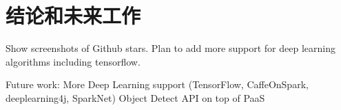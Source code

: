 \chapter{结论和未来工作}

Show screenshots of Github stars. Plan to add more support for deep learning algorithms including tensorflow.

Future work:
More Deep Learning support (TensorFlow, CaffeOnSpark, deeplearning4j, SparkNet)
Object Detect API on top of PaaS
